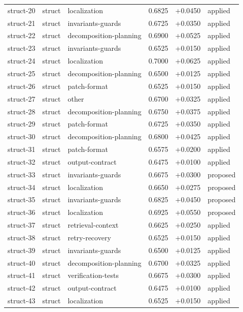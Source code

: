 \begin{center}
\begin{longtable}{llp{5.2cm}rrl}
struct-20 & struct & localization & 0.6825 & +0.0450 & applied \\
struct-21 & struct & invariants-guards & 0.6725 & +0.0350 & applied \\
struct-22 & struct & decomposition-planning & 0.6900 & +0.0525 & applied \\
struct-23 & struct & invariants-guards & 0.6525 & +0.0150 & applied \\
struct-24 & struct & localization & 0.7000 & +0.0625 & applied \\
struct-25 & struct & decomposition-planning & 0.6500 & +0.0125 & applied \\
struct-26 & struct & patch-format & 0.6525 & +0.0150 & applied \\
struct-27 & struct & other & 0.6700 & +0.0325 & applied \\
struct-28 & struct & decomposition-planning & 0.6750 & +0.0375 & applied \\
struct-29 & struct & patch-format & 0.6725 & +0.0350 & applied \\
struct-30 & struct & decomposition-planning & 0.6800 & +0.0425 & applied \\
struct-31 & struct & patch-format & 0.6575 & +0.0200 & applied \\
struct-32 & struct & output-contract & 0.6475 & +0.0100 & applied \\
struct-33 & struct & invariants-guards & 0.6675 & +0.0300 & proposed \\
struct-34 & struct & localization & 0.6650 & +0.0275 & proposed \\
struct-35 & struct & invariants-guards & 0.6825 & +0.0450 & proposed \\
struct-36 & struct & localization & 0.6925 & +0.0550 & proposed \\
struct-37 & struct & retrieval-context & 0.6625 & +0.0250 & applied \\
struct-38 & struct & retry-recovery & 0.6525 & +0.0150 & applied \\
struct-39 & struct & invariants-guards & 0.6500 & +0.0125 & applied \\
struct-40 & struct & decomposition-planning & 0.6700 & +0.0325 & applied \\
struct-41 & struct & verification-tests & 0.6675 & +0.0300 & applied \\
struct-42 & struct & output-contract & 0.6475 & +0.0100 & applied \\
struct-43 & struct & localization & 0.6525 & +0.0150 & applied \\

\end{longtable}
\end{center}
